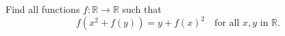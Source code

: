 Find all functions $f : \mathbb{R} \to \mathbb{R}$ such that
\[ f(x^2 + f(y)) = y + f(x)^2 \quad \text{for all } x, y \text{ in } \mathbb{R}. \]
